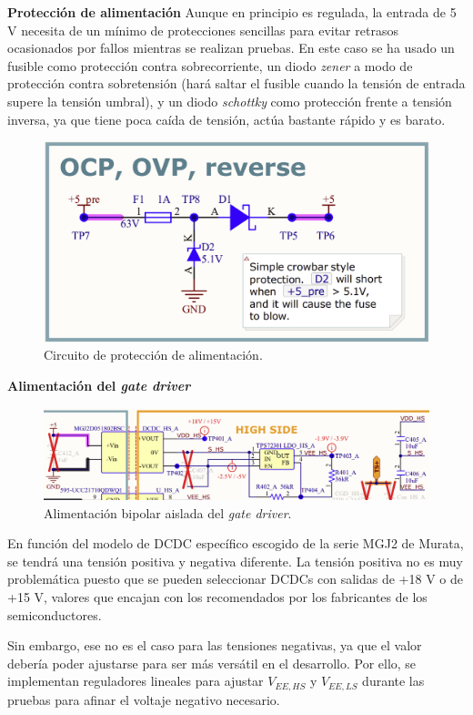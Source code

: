 \textbf{Protección de alimentación}
Aunque en principio es regulada, la entrada de 5 V necesita de un mínimo de protecciones sencillas para evitar retrasos ocasionados por fallos mientras se realizan pruebas. En este caso se ha usado un fusible como protección contra sobrecorriente, un diodo \textit{zener} a modo de protección contra sobretensión (hará saltar el fusible cuando la tensión de entrada supere la tensión umbral), y un diodo \textit{schottky} como protección frente a tensión inversa, ya que tiene poca caída de tensión, actúa bastante rápido y es barato.
\begin{figure}[H]
	\centering
	\includegraphics[width=0.5\linewidth]{fig/5V-sch}
	\caption{Circuito de protección de alimentación.}
\end{figure}

\textbf{Alimentación del \textit{gate driver}}

\begin{figure}[H]
	\centering
	\includegraphics[width=0.9\linewidth]{fig/GD-supp-sch}
	\caption{Alimentación bipolar aislada del \textit{gate driver}.}
\end{figure}

En función del modelo de DCDC específico escogido de la serie MGJ2 de Murata, se tendrá una tensión positiva y negativa diferente. La tensión positiva no es muy problemática puesto que se pueden seleccionar DCDCs con salidas de +18 V o de +15 V, valores que encajan con los recomendados por los fabricantes de los semiconductores.

Sin embargo, ese no es el caso para las tensiones negativas, ya que el valor debería poder ajustarse para ser más versátil en el desarrollo. Por ello, se implementan reguladores lineales para ajustar $V_{EE,HS}$ y $V_{EE,LS}$ durante las pruebas para afinar el voltaje negativo necesario.

